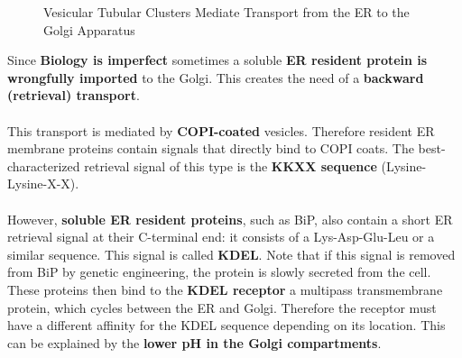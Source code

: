 \documentclass[../main.tex]{subfiles}
\begin{document}
\begin{figure}[H]
	\centering
	\caption{Vesicular Tubular Clusters Mediate Transport from the ER to the Golgi Apparatus }
\end{figure}

Since \textbf{Biology is imperfect} sometimes a soluble \textbf{ER resident protein is wrongfully imported} to the Golgi. This creates the need of a \textbf{backward (retrieval) transport}. \\
\\
This transport is mediated by \textbf{COPI-coated} vesicles. Therefore resident ER membrane proteins contain signals that directly bind to COPI coats. The best-characterized retrieval signal of this type is the \textbf{KKXX sequence} (Lysine-Lysine-X-X). \\
\\
However, \textbf{soluble ER resident proteins}, such as BiP, also contain a short ER retrieval signal at their C-terminal end: it consists of a Lys-Asp-Glu-Leu or a similar sequence. This signal is called \textbf{KDEL}. Note that if this signal is removed from BiP by genetic engineering, the protein is slowly secreted from the cell. \\
\indent These proteins then bind to the \textbf{KDEL receptor} a multipass transmembrane protein, which cycles between the ER and Golgi. Therefore the receptor must have a different affinity for the KDEL sequence depending on its location. This can be explained by the \textbf{lower pH in the Golgi compartments}. 
\end{document}
